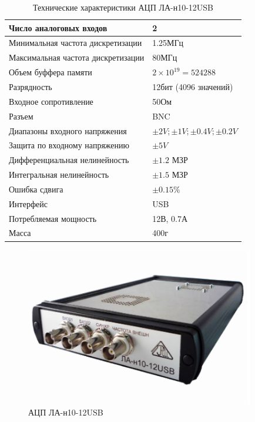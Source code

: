 \documentclass[../paper.tex]{subfiles}
\begin{document}
\begin{table}[H]
\centering
\caption{Технические характеристики АЦП ЛА-н10-12USB}

\begin{tabular}{|l|l|}
                                                                      \hline
Число аналоговых входов            & 2                             \\ \hline
Минимальная частота дискретизации  & 1.25МГц                       \\ \hline
Максимальная частота дискретизации & 80МГц                         \\ \hline
Объем буффера памяти               & $2\times10^{19}=524288$       \\ \hline
Разрядность                        & 12бит (4096 значений)         \\ \hline
Входное сопротивление              & 50Ом                          \\ \hline
Разъем                             & BNC                           \\ \hline
Диапазоны входного напряжения      & $\pm2V;\pm1V;\pm0.4V;\pm0.2V$ \\ \hline
Защита по входному напряжению      & $\pm5V$                       \\ \hline
Дифференциальная нелинейность      & $\pm1.2$ МЗР                  \\ \hline
Интегральная нелинейность          & $\pm1.5$ МЗР                  \\ \hline
Ошибка сдвига                      & $\pm0.15\%$                   \\ \hline
Интерфейс                          & USB                           \\ \hline
Потребляемая мощность              & 12В, 0.7А                     \\ \hline
Масса                              & 400г                          \\ \hline
\end{tabular}
\end{table}

\begin{figure}[H]
\centering
\includegraphics[width=10cm]{images/adc2}
\caption{АЦП ЛА-н10-12USB}
\end{figure}
\end{document}
